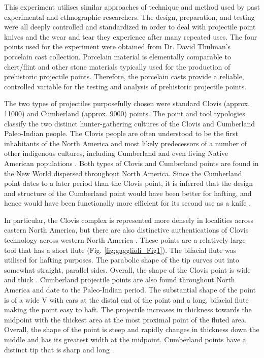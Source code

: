 	 This experiment utilises similar approaches of technique and method used by past experimental and ethnographic researchers. The design, preparation, and testing were all deeply controlled and standardized in order to deal with projectile point knives and the wear and tear they experience after many repeated uses. The four points used for the experiment were obtained from Dr. David Thulman’s porcelain cast collection. Porcelain material is elementally comparable to chert/flint and other stone materials typically used for the production of prehistoric projectile points. Therefore, the porcelain casts provide a reliable, controlled variable for the testing and analysis of prehistoric projectile points. 
	 
	 The two types of projectiles purposefully chosen were standard Clovis (approx. 11000\BC) and Cumberland (approx. 9000\BC) points. The point and tool typologies classify the two distinct hunter-gathering cultures of the Clovis and Cumberland Paleo-Indian people. The Clovis people are often understood to be the first inhabitants of the North America and most likely predecessors of a number of other indigenous cultures, including Cumberland and even living Native American populations \parencite{Haynes_2002}. Both types of Clovis and Cumberland points are found in the New World dispersed throughout North America. Since the Cumberland point dates to a later period than the Clovis point, it is inferred that the design and structure of the Cumberland point would have been better for hafting, and hence would have been functionally more efficient for its second use as a knife \parencite{Anderson_2010}.
	 
	 In particular, the Clovis complex is represented more densely in localities across eastern North America, but there are also distinctive authentications of Clovis technology across western North America \parencite{Morrow_1995}. These points are a relatively large tool that has a short flute (Fig. \ref{fig:gagglioli_Fig1}). The bifacial flute was utilised for hafting purposes. The parabolic shape of the tip curves out into somewhat straight, parallel sides. Overall, the shape of the Clovis point is wide and thick \parencite{Anderson_2010}. Cumberland projectile points are also found throughout North America and date to the Paleo-Indian period. The substantial shape of the point is of a wide V with ears at the distal end of the point and a long, bifacial flute making the point easy to haft. The projectile increases in thickness towards the midpoint with the thickest area at the most proximal point of the fluted area. Overall, the shape of the point is steep and rapidly changes in thickness down the middle and has its greatest width at the midpoint. Cumberland points have a distinct tip that is sharp and long \parencite{Anderson_2010}.

